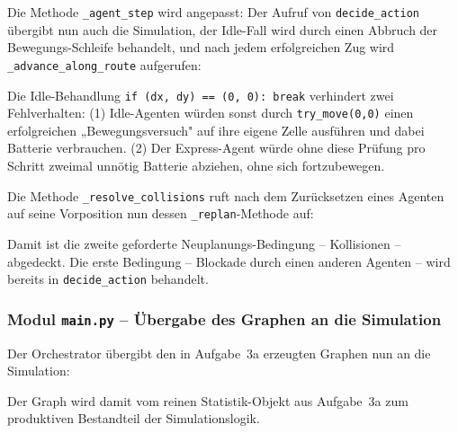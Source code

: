 Die Methode \texttt{\_agent\_step} wird angepasst: Der Aufruf von \texttt{decide\_action} übergibt nun auch die Simulation, der Idle-Fall wird durch einen Abbruch der Bewegungs-Schleife behandelt, und nach jedem erfolgreichen Zug wird \texttt{\_advance\_along\_route} aufgerufen:



Die Idle-Behandlung \texttt{if (dx, dy) == (0, 0): break} verhindert zwei Fehlverhalten: (1) Idle-Agenten würden sonst durch \texttt{try\_move(0,0)} einen erfolgreichen „Bewegungsversuch" auf ihre eigene Zelle ausführen und dabei Batterie verbrauchen. (2) Der Express-Agent würde ohne diese Prüfung pro Schritt zweimal unnötig Batterie abziehen, ohne sich fortzubewegen.

Die Methode \texttt{\_resolve\_collisions} ruft nach dem Zurücksetzen eines Agenten auf seine Vorposition nun dessen \texttt{\_replan}-Methode auf:



Damit ist die zweite geforderte Neuplanungs-Bedingung -- Kollisionen -- abgedeckt. Die erste Bedingung -- Blockade durch einen anderen Agenten -- wird bereits in \texttt{decide\_action} behandelt.


\subsubsection{Modul \texttt{main.py} – Übergabe des Graphen an die Simulation}

Der Orchestrator übergibt den in Aufgabe~3a erzeugten Graphen nun an die Simulation:



Der Graph wird damit vom reinen Statistik-Objekt aus Aufgabe~3a zum produktiven Bestandteil der Simulationslogik.


